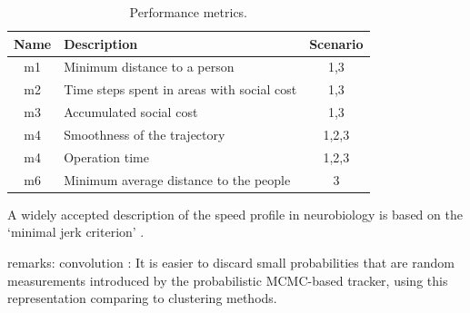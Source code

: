 \begin{table}[h!]
\centering
\begin{tabular}{||c l c||} 
 \hline
 Name & Description & Scenario \\ [0.5ex] 
 \hline\hline
 m1 & Minimum distance to a person & 1,3 \\ 
 m2 & Time steps spent in areas with social cost & 1,3  \\
 m3 & Accumulated social cost & 1,3  \\
 m4 & Smoothness of the trajectory & 1,2,3  \\
 m4 & Operation time & 1,2,3  \\
 m6 & Minimum average distance to the people & 3  \\ [1ex] 
 \hline
\end{tabular}
\caption{Performance metrics.}
\label{table:metrics}
\end{table}


A widely accepted description of the speed profile in neurobiology is based on the ‘minimal jerk criterion’ \cite{burdet1998quantization}.



remarks:
convolution : It is easier to discard small probabilities that are random measurements introduced by the probabilistic MCMC-based tracker, using this representation comparing to clustering methods.
